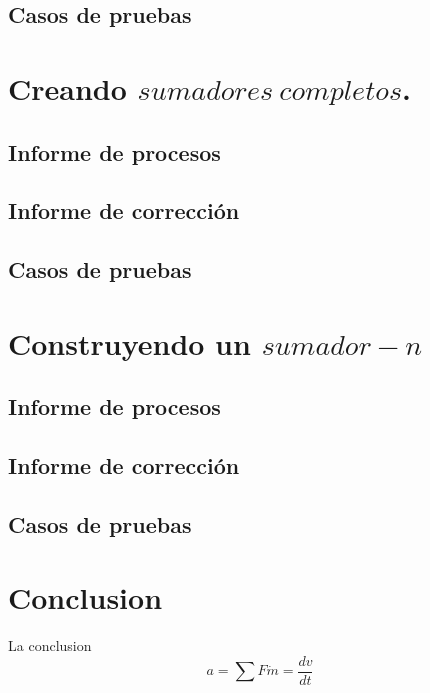 \documentclass[12pt, a4paper]{article}
\begin{document}
\subsection{Casos de pruebas}
\section{Creando $sumadores \ completos$.}
\subsection{Informe de procesos}
\subsection{Informe de corrección}
\subsection{Casos de pruebas}
\section{Construyendo un $sumador-n$}
\subsection{Informe de procesos}
\subsection{Informe de corrección}
\subsection{Casos de pruebas}
\section{Conclusion}
La conclusion
\newpage{}
\begin{displaymath}
 a = \sum F \dot m = \frac{dv}{dt}
\end{displaymath}
\end{document}
